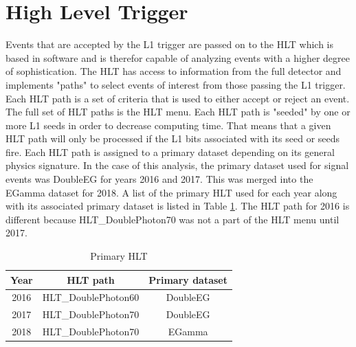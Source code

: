 \section{High Level Trigger}
Events that are accepted by the L1 trigger are passed on to the HLT which is based in software and is therefor capable of analyzing events with a higher degree of sophistication.  The HLT has access to information from the full detector and implements "paths" to select events of interest from those passing the L1 trigger.  Each HLT path is a set of criteria that is used to either accept or reject an event.  The full set of HLT paths is the HLT menu.  Each HLT path is "seeded" by one or more L1 seeds in order to decrease computing time.  That means that a given HLT path will only be processed if the L1 bits associated with its seed or seeds fire.  Each HLT path is assigned to a primary dataset depending on its general physics signature.  In the case of this analysis, the primary dataset used for signal events was DoubleEG for years 2016 and 2017.  This was merged into the EGamma dataset for 2018.  A list of the primary HLT used for each year along with its associated primary dataset is listed in Table \ref{table:HLTlist}.  The HLT path for 2016 is different because HLT\_DoublePhoton70 was not a part of the HLT menu until 2017.


\begin{table}[h!]
\centering
	\caption{Primary HLT}
	\begin{tabular}{|c|c|c|}
		\hline
		Year & HLT path & Primary dataset \\
		\hline
		2016 & HLT\_DoublePhoton60 & DoubleEG \\
		\hline
		2017 & HLT\_DoublePhoton70 & DoubleEG \\
		\hline
		2018 & HLT\_DoublePhoton70 & EGamma \\
		\hline
	\end{tabular}
\label{table:HLTlist}
\end{table}

 